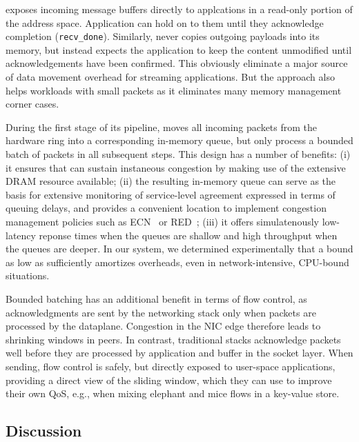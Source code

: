  \ix exposes incoming message buffers directly
to applcations in a read-only portion of the address
space. Application can hold on to them until they acknowledge completion (\texttt{recv\_done}).
Similarly, \ix never copies outgoing payloads into its memory, but
instead expects the application to keep the content unmodified until
acknowledgements have been confirmed.  This obviously eliminate a
major source of data movement overhead for streaming applications.
But the approach also helps workloads with small packets as it
eliminates many memory management corner cases.

 During the first stage of
its pipeline, \ix moves all incoming packets from the hardware ring
into a corresponding in-memory queue, but only process a bounded batch
of packets in all subsequent steps.  This design has a number of
benefits: (i) it ensures that \ix can sustain instaneous congestion by
making use of the extensive DRAM resource available; (ii) the
resulting in-memory queue can serve as the basis for extensive
monitoring of service-level agreement expressed in terms of queuing
delays, and provides a convenient location to implement congestion
management policies such as ECN~\cite{ramakrishnan2001addition} or
RED~\cite{DBLP:journals/ton/FloydJ93}; (iii) it offers simulatenously
low-latency reponse times when the queues are shallow and high
throughput when the queues are deeper.  In our system, we determined
experimentally that a bound as low as  sufficiently
amortizes overheads, even in network-intensive, CPU-bound situations.

 Bounded batching has an additional benefit
in terms of flow control, as acknowledgments are sent by the
networking stack only when packets are processed by the dataplane.
Congestion in the NIC edge therefore leads to shrinking windows in
peers.  In contrast, traditional stacks acknowledge packets well
before they are processed by application and buffer in the socket
layer.  When sending, flow control is safely, but directly exposed to
user-space applications, providing a direct view of the sliding
window, which they can use to improve their own QoS, e.g., when mixing
elephant and mice flows in a key-value store.


\subsection{Discussion}
\label{sec:impl:discussion}

